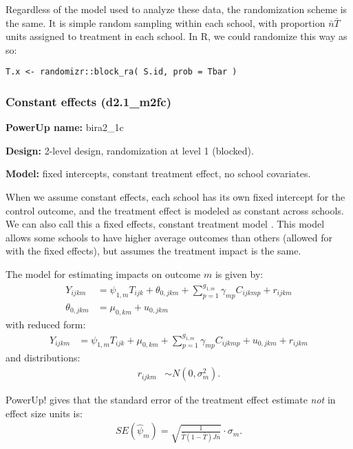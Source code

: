 \documentclass[12pt]{article}
\begin{document}
Regardless of the model used to analyze these data, the randomization scheme is the same.
It is simple random sampling within each school, with proportion $\bar{n}\bar{T}$ units assigned to treatment in each school.
In R, we could randomize this way as so:
\begin{verbatim}
T.x <- randomizr::block_ra( S.id, prob = Tbar )
\end{verbatim}



\subsubsection{Constant effects (d2.1\_m2fc)}

\textbf{PowerUp name:} bira2\_1c

\textbf{Design:} 2-level design, randomization at level 1 (blocked).

\textbf{Model:} fixed intercepts, constant treatment effect, no school covariates.

When we assume constant effects, each school has its own fixed intercept for the control outcome, and the treatment effect is modeled as constant across schools.
We can also call this a fixed effects, constant treatment model \citep{Miratrix2020}.
This model allows some schools to have higher average outcomes than others (allowed for with the fixed effects), but assumes the treatment impact is the same.

The model for estimating impacts on outcome $m$ is given by:
\begin{align}
Y_{ijkm} &= \psi_{1,m} T_{ijk} + \theta_{0,jkm} + \sum_{p=1}^{g_{1,m}} \gamma_{mp} C_{ijkmp} + r_{ijkm}\\
\nonumber \theta_{0,jkm} &= \mu_{0,km} + u_{0,jkm}
\end{align}
with reduced form:
\begin{align}
Y_{ijkm} &= \psi_{1,m} T_{ijk} + \mu_{0,km} + \sum_{p=1}^{g_{1,m}} \gamma_{mp} C_{ijkmp} + u_{0,jkm} + r_{ijkm}
\end{align}
and distributions:
\begin{align}
r_{ijkm} &\sim N\left(0, \sigma^2_m\right).
\end{align}

PowerUp! gives that the standard error of the treatment effect estimate \emph{not} in effect size units is:
\begin{align}SE( \hat{\psi}_m ) = \sqrt{\frac{1}{\bar{T}(1 - \bar{T}) J \bar{n}}} \cdot \sigma_m .\end{align}
\end{document}
